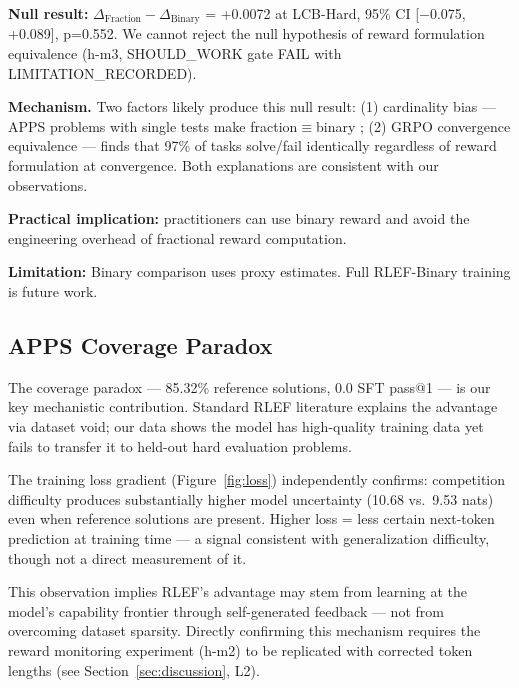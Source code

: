 \textbf{Null result:} $\Delta_{\text{Fraction}} - \Delta_{\text{Binary}}$ = +0.0072 at LCB-Hard, 95\% CI [$-$0.075, +0.089], p=0.552. We cannot reject the null hypothesis of reward formulation equivalence (h-m3, SHOULD\_WORK gate FAIL with LIMITATION\_RECORDED).

\textbf{Mechanism.} Two factors likely produce this null result: (1) cardinality bias --- APPS problems with single tests make fraction$\equiv$binary \cite{Anonymous2025VeRPO}; (2) GRPO convergence equivalence --- \cite{Anonymous2025PassRate} finds that 97\% of tasks solve/fail identically regardless of reward formulation at convergence. Both explanations are consistent with our observations.

\textbf{Practical implication:} practitioners can use binary reward and avoid the engineering overhead of fractional reward computation.

\textbf{Limitation:} Binary comparison uses proxy estimates. Full RLEF-Binary training is future work.

\subsection{APPS Coverage Paradox}

The coverage paradox --- 85.32\% reference solutions, 0.0 SFT pass@1 --- is our key mechanistic contribution. Standard RLEF literature explains the advantage via dataset void; our data shows the model has high-quality training data yet fails to transfer it to held-out hard evaluation problems.

The training loss gradient (Figure~\ref{fig:loss}) independently confirms: competition difficulty produces substantially higher model uncertainty (10.68 vs.\ 9.53 nats) even when reference solutions are present. Higher loss = less certain next-token prediction at training time --- a signal consistent with generalization difficulty, though not a direct measurement of it.

This observation implies RLEF's advantage may stem from learning at the model's capability frontier through self-generated feedback --- not from overcoming dataset sparsity. Directly confirming this mechanism requires the reward monitoring experiment (h-m2) to be replicated with corrected token lengths (see Section~\ref{sec:discussion}, L2).
